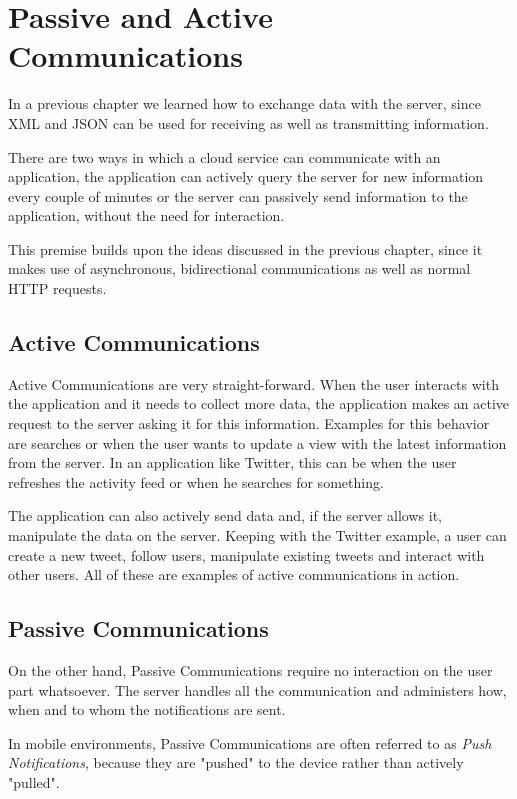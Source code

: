 \chapter{Passive and Active Communications}\label{ch:passive_com}

In a previous chapter we learned how to exchange data with the server, since \ac{XML} and \ac{JSON} can be used for receiving as well as transmitting information.

There are two ways in which a cloud service can communicate with an application, the application can actively query the server for new information every couple of minutes or the server can passively send information to the application, without the need for interaction.

This premise builds upon the ideas discussed in the previous chapter, since it makes use of asynchronous, bidirectional communications as well as normal HTTP requests.

\section{Active Communications}
Active Communications are very straight-forward. When the user interacts with the application and it needs to collect more data, the application makes an active request to the server asking it for this information. Examples for this behavior are searches or when the user wants to update a view with the latest information from the server. In an application like Twitter, this can be when the user refreshes the activity feed or when he searches for something.

The application can also actively send data and, if the server allows it, manipulate the data on the server. Keeping with the Twitter example, a user can create a new tweet, follow users, manipulate existing tweets and interact with other users. All of these are examples of active communications in action.

\section{Passive Communications}
On the other hand, Passive Communications require no interaction on the user part whatsoever. The server handles all the communication and administers how, when and to whom the notifications are sent.

In mobile environments, Passive Communications are often referred to as \textit{Push Notifications}, because they are "pushed" to the device rather than actively "pulled".

